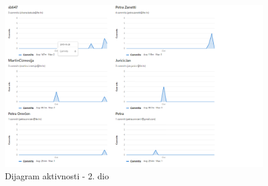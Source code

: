 		\begin{figure}[h]
		\centering
		\includegraphics[scale=0.5]{dijagrami/akt2.png}
		\caption{Dijagram aktivnosti - 2. dio}
		
	\end{figure}
		
	